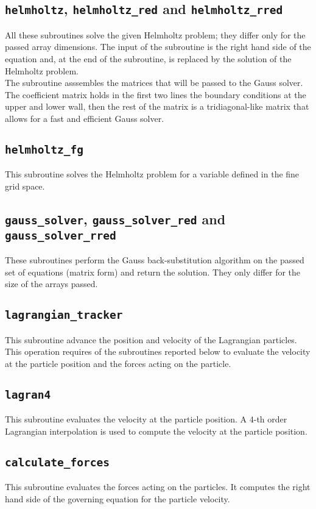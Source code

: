 \subsection{\texttt{helmholtz}, \texttt{helmholtz\_red} and \texttt{helmholtz\_rred}}
All these subroutines solve the given Helmholtz problem; they differ only for the passed array dimensions. The input of the subroutine is the right hand side of the equation and, at the end of the subroutine, is replaced by the solution of the Helmholtz problem.\\
The subroutine asssembles the matrices that will be passed to the Gauss solver. The coefficient matrix holds in the first two lines the boundary conditions at the upper and lower wall, then the rest of the matrix is a tridiagonal-like matrix that allows for a fast and efficient Gauss solver.

\subsection{\texttt{helmholtz\_fg}}
This subroutine solves the Helmholtz problem for a variable defined in the fine grid space.

\subsection{\texttt{gauss\_solver}, \texttt{gauss\_solver\_red} and \texttt{gauss\_solver\_rred}}
These subroutines perform the Gauss back-substitution algorithm on the passed set of equations (matrix form) and return the solution. They only differ for the size of the arrays passed.


\subsection{\texttt{lagrangian\_tracker}}
This subroutine advance the position and velocity of the Lagrangian particles.
This operation requires of the subroutines reported below to evaluate the velocity at the particle position and the forces acting on the particle.


\subsection{\texttt{lagran4}}
This subroutine evaluates the velocity at the particle position.
A $4$-th order Lagrangian interpolation is used to compute the velocity at the particle position.

\subsection{\texttt{calculate\_forces}}
This subroutine evaluates the forces acting on the particles.
It computes the right hand side of the governing equation for the particle velocity.

